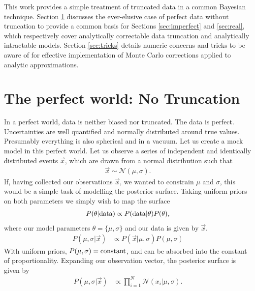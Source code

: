 \documentclass[a4paper,fleqn,usenatbib]{mnras}
\begin{document}
This work provides a simple treatment of truncated data in a common Bayesian technique. Section \ref{sec:perfect} discusses the ever-elusive case of perfect data without truncation to provide a common basis for Sections \ref{sec:imperfect} and \ref{sec:real}, which respectively cover analytically correctable data truncation and analytically intractable models. Section \ref{sec:tricks} details numeric concerns and tricks to be aware of for effective implementation of Monte Carlo corrections applied to analytic approximations.











\section{The perfect world: No Truncation}
\label{sec:perfect}
In a perfect world, data is neither biased nor truncated. The data is perfect. Uncertainties are well quantified and normally distributed around true values. Presumably everything is also spherical and in a vacuum. Let us create a mock model in this perfect world. Let us observe a series of independent and identically distributed events $\vec{x}$, which are drawn from a normal distribution such that 
\begin{align}
\vec{x} \sim \mathcal{N}(\mu,\sigma).
\end{align}
If, having collected our observations $\vec{x}$, we wanted to constrain $\mu$ and $\sigma$, this would be a simple task of modelling the posterior surface. Taking uniform priors on both parameters we simply wish to map the surface
\begin{align}
P(\theta | {\rm data}) \propto P({\rm data} | \theta) P(\theta),
\end{align}
where our model parameters $\theta = \lbrace \mu, \sigma \rbrace$ and our data is given by $\vec{x}$.
\begin{align}
P(\mu,\sigma| \vec{x}) &\propto P(\vec{x} | \mu, \sigma) P(\mu, \sigma)
\end{align}
With uniform priors, $P(\mu,\sigma) = {\rm constant}$, and can be absorbed into the constant of proportionality. Expanding our observation vector, the posterior surface is given by
\begin{align}
P(\mu,\sigma| \vec{x}) &\propto \prod_{i=1}^N \mathcal{N}(x_i | \mu, \sigma). \label{eq:prod}
\end{align}
\end{document}
